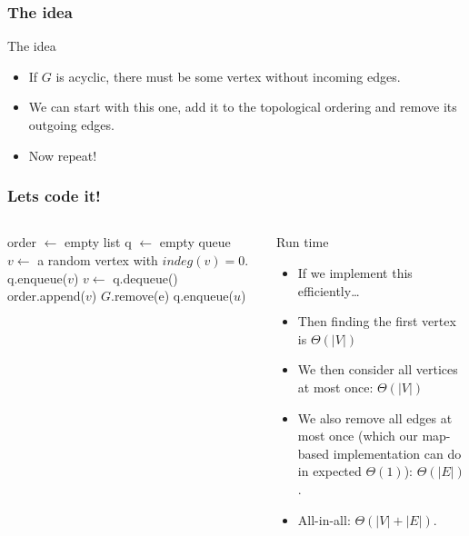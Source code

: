 \begin{frame}
	\frametitle{The idea}
	\begin{overlayarea}{\textwidth}{\textheight}
		\begin{block}{The idea}
			\begin{itemize}
				\item 
					If $G$ is acyclic, there must be some vertex without incoming edges.\\
				\item<3->
					We can start with this one, add it to the topological ordering and remove its outgoing edges.\\
				\item<4->
					Now repeat!
			\end{itemize}
		\end{block}	
	\end{overlayarea}
\end{frame}

\begin{frame}
	\frametitle{Lets code it!}
	
	\begin{columns}
		{
	\small
	\begin{algorithmic}
		\State order $\gets$ empty list
		\State q $\gets$ empty queue
		\pause
		\State $v \gets$ a random vertex with $\mathit{indeg}(v) = 0$.
		\State q.enqueue($v$)
		\pause
		\State $v \gets$ q.dequeue()
		\State order.append($v$)
		\pause
		\State $G$.remove(e)
		\pause
		\State q.enqueue($u$)
		\pause
		\EndIf
		\EndFor
		\EndWhile
		\EndFunction
	\end{algorithmic}
}
			
			\begin{block}{Run time}
				\begin{itemize}
					\item If we implement this efficiently\dots
						\pause
					\item Then finding the first vertex is $\Theta(|V|)$
						\pause
					\item We then consider all vertices at most once: $\Theta(|V|)$
						\pause
					\item We also remove all edges at most once (which our map-based implementation can do in expected
						$\Theta(1)$): $\Theta(|E|)$.
					\item All-in-all: $\Theta(|V| + |E|)$.
				\end{itemize}	
			\end{block}	
			
	\end{columns}
\end{frame}

